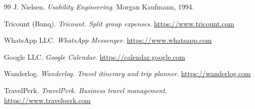 \begin{thebibliography}{99}
 J. Nielsen. \emph{Usability Engineering}. Morgan Kaufmann, 1994.

 Tricount (Bunq). \emph{Tricount. Split group expenses}. \url{https://www.tricount.com}

 WhatsApp LLC. \emph{WhatsApp Messenger}. \url{https://www.whatsapp.com}

 Google LLC. \emph{Google Calendar}. \url{https://calendar.google.com}

 Wanderlog. \emph{Wanderlog. Travel itinerary and trip planner}. \url{https://wanderlog.com}

 TravelPerk. \emph{TravelPerk. Business travel management}. \url{https://www.travelperk.com}

\end{thebibliography}
